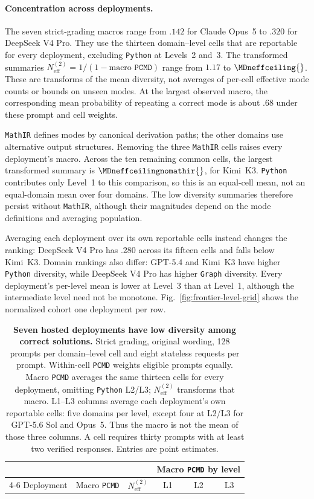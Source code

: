 \documentclass{article}
\newcommand{\1}{\mathbf 1}
\newcommand{\pmd}{\texttt{PCMD}}
\newcommand{\neff}{\ensuremath{N^{(2)}_{\mathrm{eff}}}}
\theoremstyle{remark}
\theoremstyle{definition}
\theoremstyle{plain}
\begin{document}
\paragraph{Concentration across deployments.}
The seven strict-grading macros range from $.142$ for Claude Opus~5 to
$.320$ for DeepSeek V4 Pro. They use the thirteen domain--level cells that
are reportable for every deployment, excluding \texttt{Python} at Levels~2 and~3.
The transformed summaries $\neff=1/(1-\text{macro }\pmd)$ range from
$1.17$ to $\MDneffceiling{}$. These are transforms of the mean diversity,
not averages of per-cell effective mode counts or bounds on unseen modes.
At the largest observed macro, the corresponding mean probability of
repeating a correct mode is about $.68$ under these prompt and cell weights.

\texttt{MathIR} defines modes by canonical derivation paths; the other domains use
alternative output structures. Removing the three \texttt{MathIR} cells raises every
deployment's macro. Across the ten remaining common cells, the largest
transformed summary is $\MDneffceilingnomathir{}$, for Kimi~K3. \texttt{Python}
contributes only Level~1 to this comparison, so this is an equal-cell mean,
not an equal-domain mean over four domains. The low diversity summaries
therefore persist without \texttt{MathIR}, although their magnitudes depend on the
mode definitions and averaging population.

Averaging each deployment over its own reportable cells instead changes the
ranking: DeepSeek V4 Pro has $.280$ across its fifteen cells and falls below
Kimi~K3. Domain rankings also differ: GPT-5.4 and Kimi~K3 have higher \texttt{Python}
diversity, while DeepSeek V4 Pro has higher \texttt{Graph} diversity. Every deployment's
per-level mean is lower at Level~3 than at Level~1, although the intermediate
level need not be monotone. Fig.~\ref{fig:frontier-level-grid} shows the
normalized cohort one deployment per row.

\begin{table}[!htbp]
  \centering
  \caption{\textbf{Seven hosted deployments have low diversity among correct solutions.}
  Strict grading, original wording, 128 prompts per domain--level cell and
  eight stateless requests per prompt. Within-cell \pmd{} weights eligible
  prompts equally. Macro \pmd{} averages the same thirteen cells for every
  deployment, omitting \texttt{Python} L2/L3; $\neff$ transforms that macro.
  L1--L3 columns average each deployment's own reportable cells: five domains
  per level, except four at L2/L3 for GPT-5.6 Sol and Opus~5. Thus the macro
  is not the mean of those three columns. A cell requires thirty prompts
  with at least two verified responses. Entries are point estimates.}
  \label{tab:hosted-cohort-mode-diversity}
  \small
  \begin{tabular}{lccccc}
    \toprule
    & & & \multicolumn{3}{c}{Macro \pmd{} by level} \\
    \cmidrule(lr){4-6}
    Deployment & Macro \pmd{} & $\neff$ & L1 & L2 & L3 \\
    \midrule
    
  \end{tabular}
\end{table}
\end{document}

